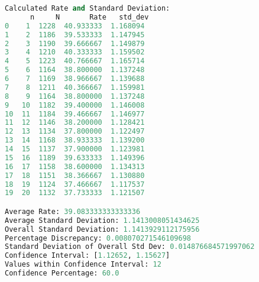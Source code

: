 \documentclass[a4paper,11pt]{article}
\begin{document}
\begin{lstlisting}[language=Python]
Calculated Rate and Standard Deviation:
      n     N       Rate   std_dev
0    1  1228  40.933333  1.168094
1    2  1186  39.533333  1.147945
2    3  1190  39.666667  1.149879
3    4  1210  40.333333  1.159502
4    5  1223  40.766667  1.165714
5    6  1164  38.800000  1.137248
6    7  1169  38.966667  1.139688
7    8  1211  40.366667  1.159981
8    9  1164  38.800000  1.137248
9   10  1182  39.400000  1.146008
10  11  1184  39.466667  1.146977
11  12  1146  38.200000  1.128421
12  13  1134  37.800000  1.122497
13  14  1168  38.933333  1.139200
14  15  1137  37.900000  1.123981
15  16  1189  39.633333  1.149396
16  17  1158  38.600000  1.134313
17  18  1151  38.366667  1.130880
18  19  1124  37.466667  1.117537
19  20  1132  37.733333  1.121507

Average Rate: 39.083333333333336
Average Standard Deviation: 1.1413008051434625
Overall Standard Deviation: 1.1413929112175956
Percentage Discrepancy: 0.008070271546109698
Standard Deviation of Overall Std Dev: 0.014876684571997062
Confidence Interval: [1.12652, 1.15627]
Values within Confidence Interval: 12
Confidence Percentage: 60.0
\end{lstlisting}
\newpage
\end{document}
